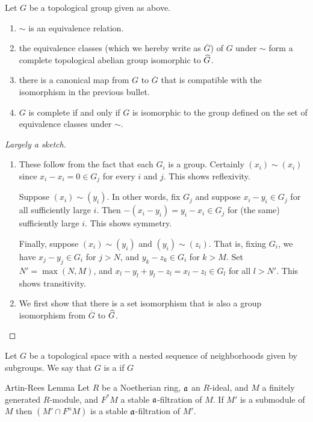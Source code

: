 \begin{prop}
Let $G$ be a topological group given as above.

\begin{enumerate}
\item $\sim$ is an equivalence relation.

\item the equivalence classes (which we hereby write as 
$\overline{G}$) of $G$ under $\sim$ form a complete topological 
abelian group isomorphic to $\widehat{G}$.

\item there is a canonical map from $G$ to $\overline{G}$ that is
compatible with the isomorphism in the previous bullet.

\item $G$ is complete if and only if $G$ is isomorphic to the
group defined on the set of equivalence classes under $\sim$.
\end{enumerate}
\end{prop}
\begin{proof}[Largely a sketch]
\begin{enumerate}
\item These follow from the fact that each $G_i$ is a group. 
Certainly $(x_i) \sim (x_i)$ since $x_i - x_i = 0 \in G_j$ for 
every $i$ and $j$. This shows reflexivity.

Suppose $(x_i) \sim (y_i)$. In other words, fix $G_j$ and suppose 
$x_i - y_i \in G_j$ for all sufficiently large $i$. Then 
$-(x_i - y_i) = y_i - x_i \in G_j$ for (the same) sufficiently 
large $i$. This shows symmetry.

Finally, suppose $(x_i) \sim (y_i)$ and $(y_i) \sim (z_i)$.
That is, fixing $G_i$, we have $x_j - y_j \in G_i$ for $j > N$,
and $y_k - z_k \in G_i$ for $k > M$. Set $N' = \max(N, M)$,
and $x_l - y_l + y_l - z_l = x_l - z_l \in G_l$ for all $l > N'$.
This shows transitivity.

\item We first show that there is a set isomorphism that is also a group 
isomorphism from $\overline{G}$ to $\widehat{G}$. 


\end{enumerate}
\end{proof}

\begin{defn}
Let $G$ be a topological space with a nested sequence of neighborhoods
given by subgroups. We say that $G$ is a 
 if
$G$ 
\end{defn}

\begin{thm}{Artin-Rees Lemma}\label{thm:artin_rees_lemma}
Let $R$ be a Noetherian ring, $\mathfrak{a}$ an $R$-ideal, and $M$ a
finitely generated $R$-module, and $F^*M$ a stable 
$\mathfrak{a}$-filtration of $M$. If $M'$ is a submodule of $M$ then
$(M' \cap F^nM)$ is a stable $\mathfrak{a}$-filtration of $M'$.
\end{thm}
